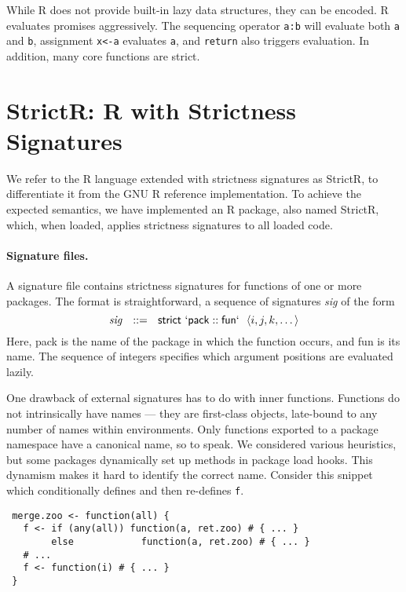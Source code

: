 \documentclass[review,creen,acmsmall]{acmart}
\newcommand{\code}[1]{\lstinline |#1|\xspace}
\renewcommand{\c}[1]{\lstinline |#1|\xspace}
\newcommand{\strictr}{{\sf StrictR}\xspace}
\begin{document}
\noindent
While R does not provide built-in lazy data structures, they can be encoded. R
evaluates promises aggressively. The sequencing operator \code{a:b} will
evaluate both \code a and \code b, assignment \code{x<-a} evaluates \code a, and
\code{return} also triggers evaluation. In addition, many core functions are
strict.

\newpage %
\section{StrictR: R with Strictness Signatures}\label{sec:strictr}

We refer to the R language extended with strictness signatures as \strictr, to
differentiate it from the GNU R reference implementation. To achieve the
expected semantics, we have implemented an R package, also named \strictr,
which, when loaded, applies strictness signatures to all loaded code.

\paragraph{Signature files.}
A signature file contains strictness signatures for functions of one or more
packages. The format is straightforward, a sequence of signatures \emph{sig} of
the form
%
\[
\mathit{sig}~~::=~~\mathsf{strict}~\mathsf{`pack}::\mathsf{fun`}~~\langle i, j, k, \dots\rangle
\]
%
Here, {\sf pack} is the name of the package in which the function occurs, and {\sf
  fun} is its name. The sequence of integers specifies which argument positions
are evaluated lazily.

One drawback of external signatures has to do with inner functions. Functions do
not intrinsically have names --- they are first-class objects, late-bound to any
number of names within environments. Only functions exported to a package
namespace have a canonical name, so to speak. We considered various heuristics,
but some packages dynamically set up methods in package load hooks. This dynamism
makes it hard to identify the correct name. Consider this snippet
which conditionally defines and then re-defines \c f.

\begin{lstlisting}
 merge.zoo <- function(all) {
   f <- if (any(all)) function(a, ret.zoo) # { ... }
        else            function(a, ret.zoo) # { ... }
   # ...
   f <- function(i) # { ... }
 }
\end{lstlisting}
\end{document}
